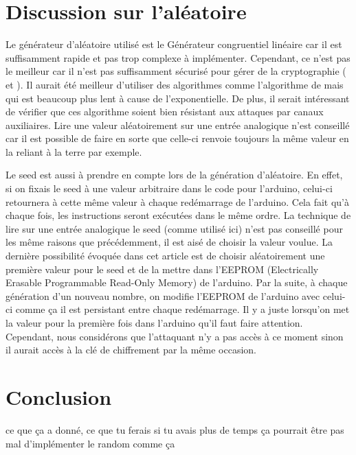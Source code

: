 \documentclass[letterpaper]{article}
\begin{document}
\section{Discussion sur l'aléatoire}
\label{sec:rand}
Le générateur d'aléatoire utilisé est le Générateur congruentiel linéaire car il est suffisamment rapide et pas trop complexe à implémenter.
Cependant, ce n'est pas le meilleur car il n'est pas suffisamment sécurisé pour gérer de la cryptographie (\cite{stern1987secret} et \cite{Plumstead1983}).
Il aurait été meilleur d'utiliser des algorithmes comme l'algorithme de \cite{blum1984generate} mais qui est beaucoup plus lent à cause de l'exponentielle.
De plus, il serait intéressant de vérifier que ces algorithme soient bien résistant aux attaques par canaux auxiliaires.
Lire une valeur aléatoirement sur une entrée analogique n'est conseillé car il est possible de faire en sorte que celle-ci renvoie toujours la même valeur en la reliant à la terre par exemple.

Le seed est aussi à prendre en compte lors de la génération d'aléatoire.
En effet, si on fixais le seed à une valeur arbitraire dans le code pour l'arduino, celui-ci retournera à cette même valeur à chaque redémarrage de l'arduino.
Cela fait qu'à chaque fois, les instructions seront exécutées dans le même ordre.
La technique de lire sur une entrée analogique le seed (comme utilisé ici) n'est pas conseillé pour les même raisons que précédemment, il est aisé de choisir la valeur voulue.
La dernière possibilité évoquée dans cet article est de choisir aléatoirement une première valeur pour le seed et de la mettre dans l'EEPROM (Electrically Erasable Programmable Read-Only Memory) de l'arduino. Par la suite, à chaque génération d'un nouveau nombre, on modifie l'EEPROM de l'arduino avec celui-ci comme ça il est persistant entre chaque redémarrage.
Il y a juste lorsqu'on met la valeur pour la première fois dans l'arduino qu'il faut faire attention.
Cependant, nous considérons que l'attaquant n'y a pas accès à ce moment sinon il aurait accès à la clé de chiffrement par la même occasion.

\section{Conclusion}
ce que ça a donné, ce que tu ferais si tu avais plus de temps
ça pourrait être pas mal d'implémenter le random comme ça


\footnotesize


\end{document}
